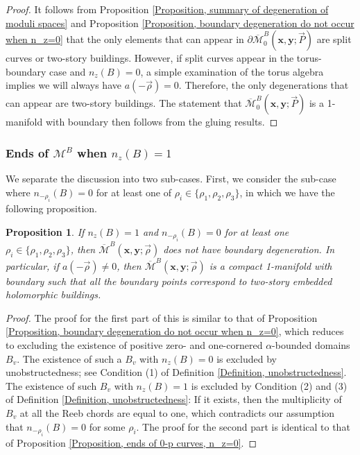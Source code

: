 \documentclass{amsart}
\newtheorem{prop}[thm]{Proposition}
\theoremstyle{definition}
\theoremstyle{remark}
\numberwithin{equation}{section}
\numberwithin{equation}{section} \makeatletter
\begin{document}
\begin{proof}
It follows from Proposition \ref{Proposition, summary of degeneration of moduli spaces} and Proposition \ref{Proposition, boundary degeneration do not occur when n_z=0} that the only elements that can appear in $\partial\overline{\mathcal{M}}_0^B(\bm{x},\bm{y};\overrightarrow{P})$ are split curves or two-story buildings. However, if split curves appear in the torus-boundary case and $n_z(B)=0$, a simple examination of the torus algebra implies we will always have $a(-\overrightarrow{\rho})=0$. Therefore, the only degenerations that can appear are two-story buildings. The statement that $\overline{\mathcal{M}}_0^B(\bm{x},\bm{y};\overrightarrow{P})$ is a 1-manifold with boundary then follows from the gluing results.
\end{proof}


\subsubsection{Ends of $\mathcal{M}^B$ when $n_z(B)=1$}
We separate the discussion into two sub-cases. First, we consider the sub-case where $n_{-\rho_i}(B)=0$ for at least one of $\rho_i\in \{\rho_1,\rho_2,\rho_3\}$, in which we have the following proposition.
\begin{prop}\label{Propostion, bondary degeneration do not occur when one of the Reeb chord is not covered}
If $n_z(B)=1$ and $n_{-\rho_i}(B)=0$ for at least one $\rho_i\in \{\rho_1,\rho_2,\rho_3\}$, then $\overline{\mathcal{M}}^B(\bm{x},\bm{y};\overrightarrow{\rho})$ does not have boundary degeneration. In particular, if $a(-\overrightarrow{\rho})\neq 0$, then $\overline{\mathcal{M}}^B(\bm{x},\bm{y};\overrightarrow{\rho})$ is a compact 1-manifold with boundary such that all the boundary points correspond to two-story embedded holomorphic buildings. 
\end{prop}
\begin{proof}
The proof for the first part of this is similar to that of Proposition \ref{Proposition, boundary degeneration do not occur when n_z=0}, which reduces to excluding the existence of positive zero- and one-cornered $\alpha$-bounded domains $B_v$. The existence of such a $B_v$ with $n_z(B)=0$ is excluded by unobstructedness; see Condition (1) of Definition \ref{Definition, unobstructedness}. The existence of such $B_v$ with $n_z(B)=1$ is excluded by Condition (2) and (3) of Definition \ref{Definition, unobstructedness}: If it exists, then the multiplicity of $B_v$ at all the Reeb chords are equal to one, which contradicts our assumption that $n_{-\rho_i}(B)=0$ for some $\rho_i$. The proof for the second part is identical to that of Proposition \ref{Proposition, ends of 0-p curves, n_z=0}.
\end{proof}
\end{document}
